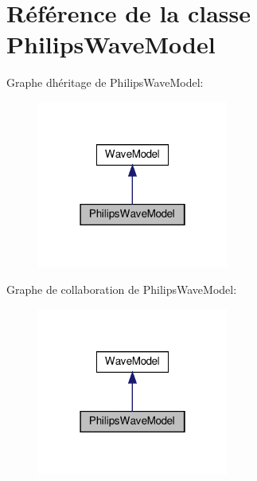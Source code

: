 \hypertarget{class_philips_wave_model}{}\section{Référence de la classe Philips\+Wave\+Model}
\label{class_philips_wave_model}


Graphe d\textquotesingle{}héritage de Philips\+Wave\+Model\+:
\nopagebreak
\begin{figure}[H]
\begin{center}
\leavevmode
\includegraphics[width=178pt]{class_philips_wave_model__inherit__graph}
\end{center}
\end{figure}


Graphe de collaboration de Philips\+Wave\+Model\+:
\nopagebreak
\begin{figure}[H]
\begin{center}
\leavevmode
\includegraphics[width=178pt]{class_philips_wave_model__coll__graph}
\end{center}
\end{figure}

